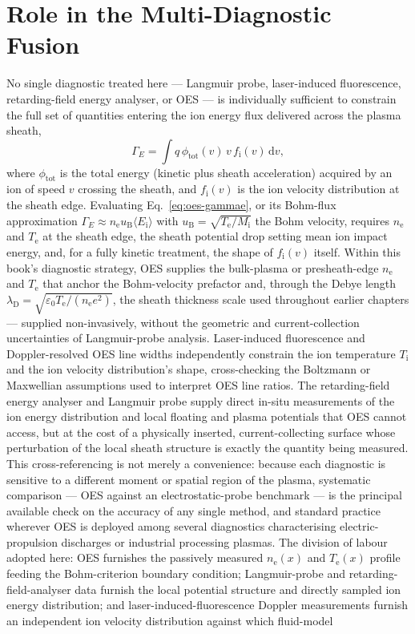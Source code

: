 \section{Role in the Multi-Diagnostic Fusion}

No single diagnostic treated here — Langmuir probe, laser-induced fluorescence, retarding-field energy analyser, or OES — is individually sufficient to constrain the full set of quantities entering the ion energy flux delivered across the plasma sheath,
\begin{equation}
\Gamma_{E} = \int q\,\phi_{\mathrm{tot}}(v)\, v\, f_{\mathrm{i}}(v)\, \mathrm{d}v ,
\label{eq:oes-gammae}
\end{equation}
where $\phi_{\mathrm{tot}}$ is the total energy (kinetic plus sheath acceleration) acquired by an ion of speed $v$ crossing the sheath, and $f_{\mathrm{i}}(v)$ is the ion velocity distribution at the sheath edge. Evaluating Eq.~\eqref{eq:oes-gammae}, or its Bohm-flux approximation $\Gamma_{E}\approx n_{\mathrm{e}} u_{\mathrm{B}} \langle E_{\mathrm{i}}\rangle$ with $u_{\mathrm{B}}=\sqrt{T_{\mathrm{e}}/M_{\mathrm{i}}}$ the Bohm velocity, requires $n_{\mathrm{e}}$ and $T_{\mathrm{e}}$ at the sheath edge, the sheath potential drop setting mean ion impact energy, and, for a fully kinetic treatment, the shape of $f_{\mathrm{i}}(v)$ itself. Within this book's diagnostic strategy, OES supplies the bulk-plasma or presheath-edge $n_{\mathrm{e}}$ and $T_{\mathrm{e}}$ that anchor the Bohm-velocity prefactor and, through the Debye length $\lambda_{\mathrm{D}} = \sqrt{\varepsilon_{0}T_{\mathrm{e}}/(n_{\mathrm{e}}e^{2})}$, the sheath thickness scale used throughout earlier chapters — supplied non-invasively, without the geometric and current-collection uncertainties of Langmuir-probe analysis. Laser-induced fluorescence and Doppler-resolved OES line widths independently constrain the ion temperature $T_{\mathrm{i}}$ and the ion velocity distribution's shape, cross-checking the Boltzmann or Maxwellian assumptions used to interpret OES line ratios. The retarding-field energy analyser and Langmuir probe supply direct in-situ measurements of the ion energy distribution and local floating and plasma potentials that OES cannot access, but at the cost of a physically inserted, current-collecting surface whose perturbation of the local sheath structure is exactly the quantity being measured. This cross-referencing is not merely a convenience: because each diagnostic is sensitive to a different moment or spatial region of the plasma, systematic comparison — OES against an electrostatic-probe benchmark \cite{ref0266} — is the principal available check on the accuracy of any single method, and standard practice wherever OES is deployed among several diagnostics characterising electric-propulsion discharges \cite{ref0256,ref0257} or industrial processing plasmas. The division of labour adopted here: OES furnishes the passively measured $n_{\mathrm{e}}(x)$ and $T_{\mathrm{e}}(x)$ profile feeding the Bohm-criterion boundary condition; Langmuir-probe and retarding-field-analyser data furnish the local potential structure and directly sampled ion energy distribution; and laser-induced-fluorescence Doppler measurements furnish an independent ion velocity distribution against which fluid-model 